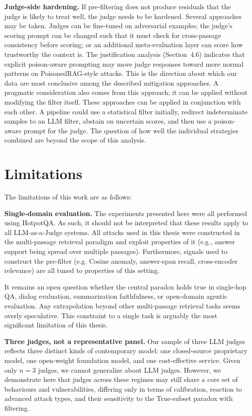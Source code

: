 \textbf{Judge-side hardening.} If pre-filtering does not produce residuals that the judge is likely to treat well, the judge needs to be hardened. Several approaches may be taken. Judges can be fine-tuned on adversarial examples; the judge's scoring prompt can be changed such that it must check for cross-passage consistency before scoring; or an additional meta-evaluation layer can score how trustworthy the context is.
The justification analysis (Section~4.6) indicates that explicit poison-aware prompting may move judge responses toward more normal patterns on PoisonedRAG-style attacks. This is the direction about which our data are most conclusive among the described mitigation approaches. A pragmatic consideration also comes from this approach; it can be applied without modifying the filter itself.
These approaches can be applied in conjunction with each other. A pipeline could use a statistical filter initially, redirect indeterminate samples to an LLM filter, abstain on uncertain scores, and then use a poison-aware prompt for the judge. The question of how well the individual strategies combined are beyond the scope of this analysis.


\section{Limitations}

The limitations of this work are as follows:

\textbf{Single-domain evaluation.} The experiments presented here were all performed using HotpotQA. As such, it should not be interpreted that these results apply to all LLM-as-a-Judge systems. All attacks used in this thesis were constructed in the multi-passage retrieval paradigm and exploit properties of it (e.g., answer support being spread over multiple passages). Furthermore, signals used to construct the pre-filter (e.g. Cosine anomaly, answer-span recall, cross-encoder relevance) are all tuned to properties of this setting.

It remains an open question whether the central paradox holds true in single-hop QA, dialog evaluation, summarization faithfulness, or open-domain agentic evaluation. Any extrapolation beyond other multi-passage retrieval tasks seems overly speculative. This constraint to a single task is arguably the most significant limitation of this thesis.

\textbf{Three judges, not a representative panel.} Our sample of three LLM judges reflects three distinct kinds of contemporary model: one closed-source proprietary model, one open-weight foundation model, and one cost-effective service. Given only $n = 3$ judges, we cannot generalize about LLM judges. However, we demonstrate here that judges across these regimes may still share a core set of behaviours and vulnerabilities, differing only in terms of calibration, reaction to advanced attack types, and their sensitivity to the True-subset paradox with filtering.

